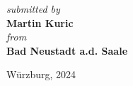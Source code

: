 \begin{titlepage}
    \vspace{\vhalf}
    \textit{submitted by} \\
    \vspace{\vhalf}
    {\Large \textbf{Martin Kuric}} \\
    \vspace{\vhalf}
    \textit{from} \\
    \vspace{\vhalf}
    \textbf{Bad Neustadt a.d. Saale}

    \vfill
    Würzburg, {\large 2024}

\end{titlepage}






